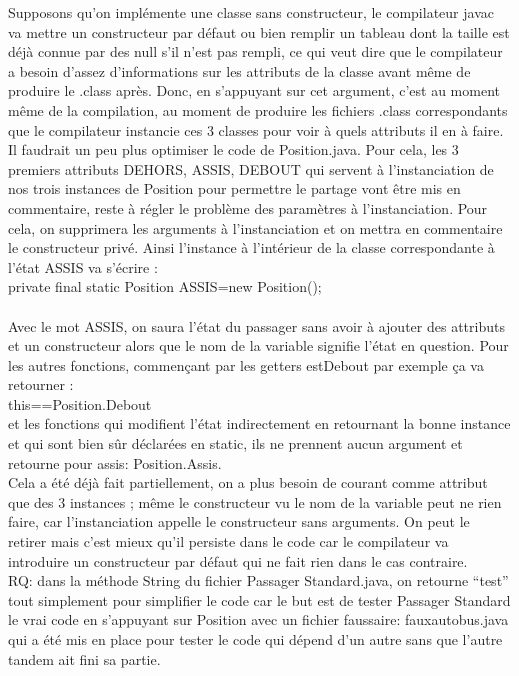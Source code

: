 \documentclass{article}
\begin{document}
Supposons qu’on implémente une classe sans constructeur, le compilateur javac va mettre
un constructeur par défaut ou bien remplir un tableau dont la taille est déjà connue par des null s’il n’est pas rempli, ce qui veut dire que le compilateur a besoin d’assez d’informations sur les attributs de la classe avant même de produire le .class après.
Donc, en s’appuyant sur cet argument, c’est au moment même de la compilation, au
moment de produire les fichiers .class correspondants que le compilateur instancie ces 3
classes pour voir à quels attributs il en à faire.
\\
Il faudrait un peu plus optimiser le code de Position.java. Pour cela, les 3 premiers attributs DEHORS, ASSIS, DEBOUT qui servent à l’instanciation de nos trois instances de Position pour permettre le partage vont être mis en commentaire, reste à régler le problème des paramètres à l’instanciation. Pour cela, on supprimera les arguments à l’instanciation et on mettra en commentaire le constructeur privé. Ainsi l’instance à l'intérieur de la classe correspondante à l’état ASSIS va s'écrire :\\
private final static Position ASSIS=new Position();\\
\\
Avec le mot ASSIS, on saura l’état du passager sans avoir à ajouter des attributs et un
constructeur alors que le nom de la variable signifie l’état en question. Pour les autres
fonctions, commençant par les getters estDebout par exemple ça va retourner : \\
this==Position.Debout \\ 
et les fonctions qui modifient l’état indirectement en retournant la bonne instance et qui sont bien sûr déclarées en static, ils ne prennent aucun argument et
retourne pour assis: Position.Assis.
\\
\newline
Cela a été déjà fait partiellement, on a plus besoin de courant comme attribut que des 3
instances ; même le constructeur vu le nom de la variable peut ne rien faire, car
l’instanciation appelle le constructeur sans arguments. On peut le retirer mais c’est mieux qu’il persiste dans le code car le compilateur va introduire un constructeur par défaut qui ne fait rien dans le cas contraire.\\
RQ: dans la méthode String du fichier Passager Standard.java, on retourne “test” tout
simplement pour simplifier le code car le but est de tester Passager Standard le vrai code en s’appuyant sur Position avec un fichier faussaire: fauxautobus.java qui a été mis en place pour tester le code qui dépend d’un autre sans que l’autre tandem ait fini sa partie.\\
\end{document}
